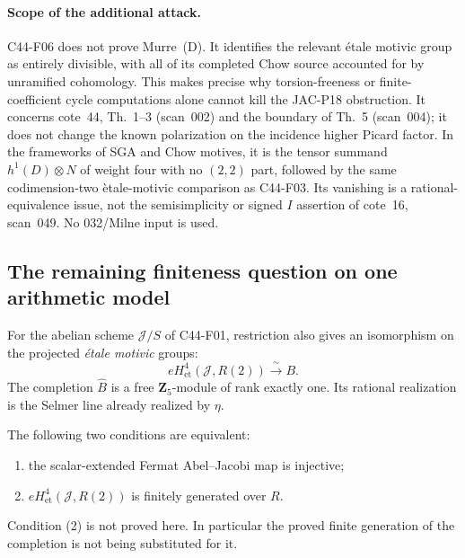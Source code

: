 \paragraph{Scope of the additional attack.}
C44-F06 does not prove Murre~(D).  It identifies the relevant
\'etale motivic group as entirely divisible, with all of its
completed Chow source accounted for by unramified cohomology.
This makes precise why torsion-freeness or finite-coefficient
cycle computations alone cannot kill the JAC-P18 obstruction.
It concerns cote~44, Th.~1--3 (scan~002) and the boundary of
Th.~5 (scan~004); it does not change the known polarization
on the incidence higher Picard factor.  In the frameworks of
SGA and Chow motives, it is the tensor summand
$h^1(D)\otimes N$ of weight four with no $(2,2)$ part,
followed by the same codimension-two \`etale-motivic comparison
as C44-F03.  Its vanishing is a rational-equivalence issue,
not the semisimplicity or signed $I$ assertion of cote~16,
scan~049.  No 032/Milne input is used.

\subsection{The remaining finiteness question on one arithmetic model}

\begin{proposition}[C44-F07]\label{C44-F07}
For the abelian scheme $\mathcal J/S$ of C44-F01, restriction
also gives an isomorphism on the projected \emph{\'etale
motivic} groups:
\[
 eH^4_{\mathrm{et}}(\mathcal J,R(2))
                 \xrightarrow{\ \sim\ } B.
                                                        \tag{F07.1}
\]
The completion $\widehat B$ is a free $\mathbf Z_5$-module
of rank exactly one.  Its rational realization is the Selmer
line already realized by $\eta$.

The following two conditions are equivalent:
\begin{enumerate}
\item the scalar-extended Fermat Abel--Jacobi map is injective;
\item $eH^4_{\mathrm{et}}(\mathcal J,R(2))$ is finitely
      generated over $R$.
\end{enumerate}
Condition (2) is not proved here.  In particular the proved
finite generation of the completion is not being substituted
for it.
\end{proposition}

